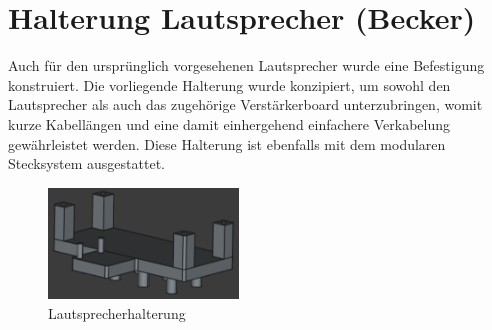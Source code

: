 \section{Halterung Lautsprecher (Becker) \label{sec:speaker_holder}}

Auch für den ursprünglich vorgesehenen Lautsprecher wurde eine Befestigung konstruiert. 
Die vorliegende Halterung wurde konzipiert, um sowohl den Lautsprecher als auch das zugehörige Verstärkerboard unterzubringen, womit kurze Kabellängen und eine damit einhergehend einfachere Verkabelung gewährleistet werden. 
Diese Halterung ist ebenfalls mit dem modularen Stecksystem ausgestattet.


\begin{figure}[ht]
    \centering
    \includegraphics[width=0.45\textwidth, keepaspectratio]{images/becker_cad_speaker.png}
    \caption{Lautsprecherhalterung}
\end{figure}
